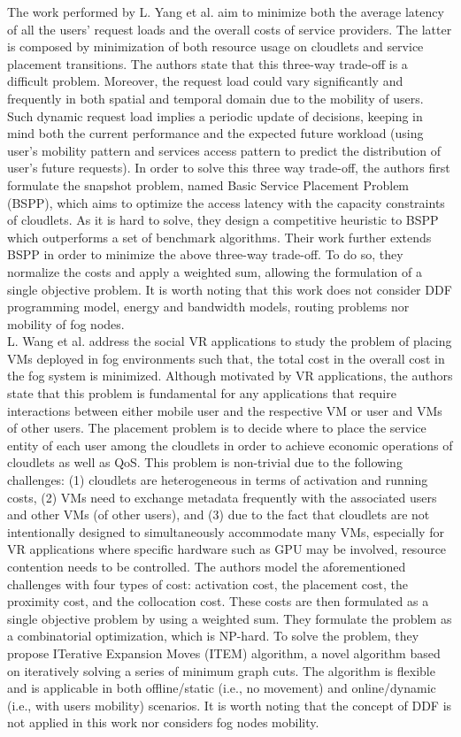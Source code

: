 \noindent\tab The work performed by L. Yang et al. \cite{yang2016cost} aim to minimize both the average latency of all the users’ request loads and the overall costs of service providers. The latter is composed by minimization of both resource usage on cloudlets and service placement transitions. The authors state that this three-way trade-off is a difficult problem. Moreover, the request load could vary significantly and frequently in both spatial and temporal domain due to the mobility of users. Such dynamic request load implies a periodic update of decisions, keeping in mind both the current performance and the expected future workload (using user’s mobility pattern and services access pattern to predict the distribution of user’s future requests). In order to solve this three way trade-off, the authors first formulate the snapshot problem, named Basic Service Placement Problem (BSPP), which aims to optimize the access latency with the capacity constraints of cloudlets. As it is hard to solve, they design a competitive heuristic to BSPP which outperforms a set of benchmark algorithms. Their work further extends BSPP in order to minimize the above three-way trade-off. To do so, they normalize the costs and apply a weighted sum, allowing the formulation of a single objective problem. It is worth noting that this work does not consider DDF programming model, energy and bandwidth models, routing problems nor mobility of fog nodes.\\
\noindent\tab L. Wang et al. \cite{wang2018service} address the social VR applications to study the problem of placing VMs deployed in fog environments such that, the total cost in the overall cost in the fog system is minimized. Although motivated by VR applications, the authors state that this problem is fundamental for any applications that require interactions between either mobile user and the respective VM or user and VMs of other users. The placement problem is to decide where to place the service entity of each user among the cloudlets in order to achieve economic operations of cloudlets as well as QoS. This problem is non-trivial due to the following challenges: (1) cloudlets are heterogeneous in terms of activation and running costs, (2) VMs need to exchange metadata frequently with the associated users and other VMs (of other users), and (3) due to the fact that cloudlets are not intentionally designed to simultaneously accommodate many VMs, especially for VR applications where specific hardware such as GPU may be involved, resource contention needs to be controlled. The authors model the aforementioned challenges with four types of cost: activation cost, the placement cost, the proximity cost, and the collocation cost. These costs are then formulated as a single objective problem by using a weighted sum. They formulate the problem as a combinatorial optimization, which is NP-hard. To solve the problem, they propose ITerative Expansion Moves (ITEM) algorithm, a novel algorithm based on iteratively solving a series of minimum graph cuts. The algorithm is flexible and is applicable in both offline/static (i.e., no movement) and online/dynamic (i.e., with users mobility) scenarios. It is worth noting that the concept of DDF is not applied in this work nor considers fog nodes mobility.\\
